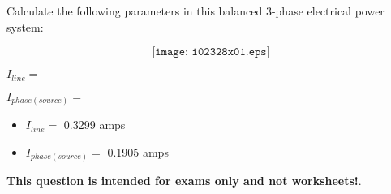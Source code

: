 

Calculate the following parameters in this balanced 3-phase electrical power system:

$$\texttt{[image: i02328x01.eps]}$$

\medskip
\item{} $I_{line} =$
\vskip 10pt
\item{} $I_{phase(source)} =$
\vskip 10pt
\medskip







\begin{itemize}
\item{} $I_{line} =$ 0.3299 amps
\vskip 10pt
\item{} $I_{phase(source)} =$ 0.1905 amps
\end{itemize}







{\bf This question is intended for exams only and not worksheets!}.




